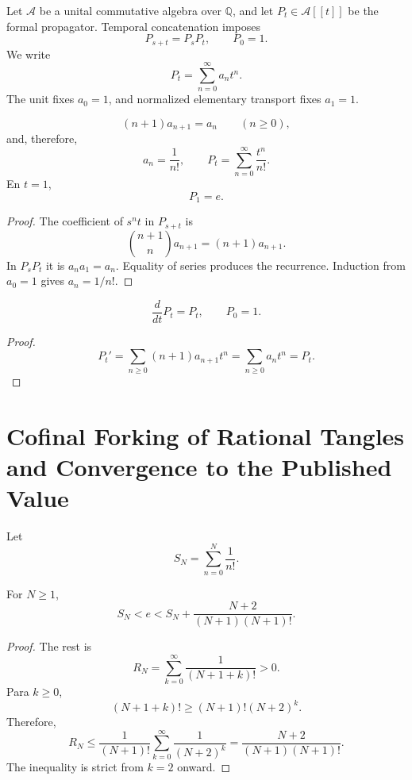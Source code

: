 Let \(\mathcal A\) be a unital commutative algebra over \(\mathbb Q\), and
let \(P_t\in\mathcal A[[t]]\) be the formal propagator. Temporal
concatenation imposes
\[
 P_{s+t}=P_sP_t,
 \qquad
 P_0=1.
\]
We write
\[
 P_t=\sum_{n=0}^{\infty}a_nt^n.
\]
The unit fixes \(a_0=1\), and normalized elementary transport fixes
\(a_1=1\).

\begin{theorem}
\label{gfp:b:thm:recurrencia-factorial-e}
\[
 (n+1)a_{n+1}=a_n
 \qquad(n\geq0),
\]
and, therefore,
\[
 a_n=\frac1{n!},
 \qquad
 P_t=\sum_{n=0}^{\infty}\frac{t^n}{n!}.
\]
En \(t=1\),
\[
 \boxed{P_1=e.}
\]
\end{theorem}

\begin{proof}
The coefficient of \(s^nt\) in \(P_{s+t}\) is
\[
 \binom{n+1}{n}a_{n+1}=(n+1)a_{n+1}.
\]
In \(P_sP_t\) it is \(a_na_1=a_n\). Equality of series produces the
recurrence. Induction from \(a_0=1\) gives \(a_n=1/n!\).
\end{proof}

\begin{corollary}
\[
 \frac{d}{dt}P_t=P_t,
 \qquad P_0=1.
\]
\end{corollary}

\begin{proof}
\[
 P_t'=\sum_{n\geq0}(n+1)a_{n+1}t^n
 =\sum_{n\geq0}a_nt^n=P_t.
\]
\end{proof}

\section{Cofinal Forking of Rational Tangles and Convergence to the Published Value}

Let
\[
 S_N=\sum_{n=0}^{N}\frac1{n!}.
\]

\begin{theorem}
\label{gfp:b:thm:cota-factorial-e}
For \(N\geq1\),
\begin{equation}
 \boxed{
 S_N<e<
 S_N+\frac{N+2}{(N+1)(N+1)!}.}
 \label{gfp:b:eq:horquilla-factorial-e}
\end{equation}
\end{theorem}

\begin{proof}
The rest is
\[
 R_N=\sum_{k=0}^{\infty}\frac1{(N+1+k)!}>0.
\]
Para \(k\geq0\),
\[
 (N+1+k)!
 \geq(N+1)!(N+2)^k.
\]
Therefore,
\[
 R_N
 \leq\frac1{(N+1)!}
 \sum_{k=0}^{\infty}\frac1{(N+2)^k}
 =\frac{N+2}{(N+1)(N+1)!}.
\]
The inequality is strict from \(k=2\) onward.
\end{proof}

